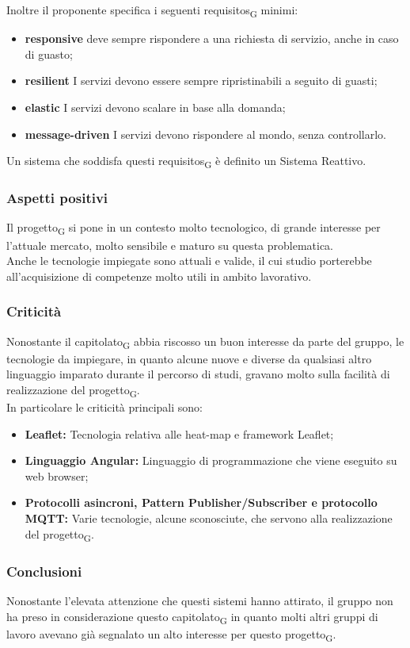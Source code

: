 Inoltre il proponente specifica i seguenti \glspl{requisito}\textsubscript{G} minimi:
\begin{itemize}
	\item \textbf{responsive} deve sempre rispondere a una richiesta di servizio, anche in caso di guasto;
	\item \textbf{resilient} I servizi devono essere sempre ripristinabili a seguito di guasti;
	\item \textbf{elastic} I servizi devono scalare in base alla domanda;
	\item \textbf{message-driven} I servizi devono rispondere al mondo, senza controllarlo.
\end{itemize}
Un sistema che soddisfa questi \glspl{requisito}\textsubscript{G} è definito un Sistema Reattivo.


\subsubsection{Aspetti positivi}

Il \gls{progetto}\textsubscript{G} si pone in un contesto molto tecnologico, di grande interesse per l'attuale mercato, molto sensibile e maturo su questa problematica.\\
Anche le tecnologie impiegate sono attuali e valide, il cui studio porterebbe all'acquisizione di competenze molto utili in ambito lavorativo.



\subsubsection{Criticità}

Nonostante il \gls{capitolato}\textsubscript{G} abbia riscosso un buon interesse da parte del gruppo, le tecnologie da impiegare, in quanto alcune nuove e diverse da qualsiasi altro linguaggio imparato durante il percorso di studi, gravano molto sulla facilità di realizzazione del \gls{progetto}\textsubscript{G}.\\
In particolare le criticità principali sono:
\begin{itemize}
    \item \textbf{Leaflet:} Tecnologia relativa alle heat-map e framework Leaflet;
    \item \textbf{Linguaggio Angular:} Linguaggio di programmazione che viene eseguito su web browser;
    \item \textbf{Protocolli asincroni, Pattern Publisher/Subscriber e protocollo MQTT: } Varie tecnologie, alcune sconosciute, che servono alla realizzazione del \gls{progetto}\textsubscript{G}.
\end{itemize}


\subsubsection{Conclusioni}

Nonostante l'elevata attenzione che questi sistemi hanno attirato, il gruppo non ha preso in considerazione questo \gls{capitolato}\textsubscript{G} in quanto molti altri gruppi di lavoro avevano già segnalato un alto interesse per questo \gls{progetto}\textsubscript{G}. \\

